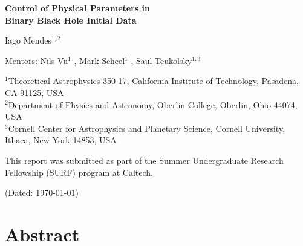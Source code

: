 \documentclass{../document}
\newcommand{\Caltech}{Theoretical Astrophysics 350-17, California Institute of Technology, Pasadena, CA 91125, USA}
\newcommand{\CaltechId}{1}
\newcommand{\Oberlin}{Department of Physics and Astronomy, Oberlin College, Oberlin, Ohio 44074, USA}
\newcommand{\OberlinId}{2}
\newcommand{\Cornell}{Cornell Center for Astrophysics and Planetary Science, Cornell University, Ithaca, New York 14853, USA}
\newcommand{\CornellId}{3}
\begin{document}
  \thispagestyle{plain}

  \vspace*{0.5cm}

  \begin{center}
    \Large\bf
    Control of Physical Parameters in \\
    Binary Black Hole Initial Data
  \end{center}
    
  \begin{center}
    Iago Mendes$^{\CaltechId,\OberlinId}$
  \end{center}

  \begin{flushleft}
    Mentors:
      Nils Vu$^\CaltechId$
        ,
      Mark Scheel$^\CaltechId$
        ,
      Saul Teukolsky$^{\CaltechId,\CornellId}$
  \end{flushleft}
   
  \begin{flushleft}
    \footnotesize
    $^\CaltechId$\Caltech \\
    $^\OberlinId$\Oberlin \\
    $^\CornellId$\Cornell
  \end{flushleft}

  \begin{flushleft}
    This report was submitted as part of the Summer Undergraduate Research Fellowship (SURF) program at Caltech.
  \end{flushleft}

  \begin{center}
    (Dated: \today)
  \end{center}

  \vspace*{0.5cm}

  \section*{Abstract}
\end{document}
